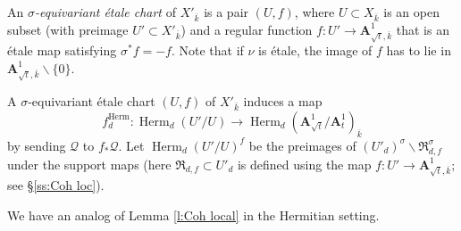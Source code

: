\documentclass[reqno]{amsart}
\numberwithin{equation}{section}
\newcommand{\A}{\mathbf{A}}
\newcommand{\bs}{\backslash}
\DeclareMathOperator{\Herm}{Herm}
\newcommand{\SH}{\textup{SkHm}}
\newcommand{\ov}{\overline}
\newcommand{\s}{\sigma}
\newcommand\cQ{\mathcal{Q}}
\newcommand\frR{\mathfrak{R}}
\theoremstyle{remark}
\numberwithin{equation}{section}
\begin{document}
An {\em $\s$-equivariant \'etale chart} of $X'_{\ov k}$ is  a pair $(U,f)$, where $U\subset X_{\ov k}$ is an open subset (with preimage $U'\subset X'_{\ov k}$) and a regular function $f: U'\to \A^{1}_{\sqrt{t}, \ov k}$ that is an \'etale map satisfying $\s^{*}f=-f$. Note that if $\nu$ is \'etale, the image of $f$ has to lie in $\A^{1}_{\sqrt{t}, \ov k}\bs\{0\}$.  

A  $\s$-equivariant \'etale chart $(U,f)$ of $X'_{\ov k}$ induces a map 
\[
f^{\Herm}_{d}: \Herm_{d}(U'/U)\to \Herm_{d}(\A^{1}_{\sqrt{t}}/\A^{1}_{t})_{\ov k}
\]
by sending $\cQ$ to  $f_{*}\cQ$. Let $\Herm_{d}(U'/U)^{f}$  be the preimages of $(U'_{d})^{\s}\bs \frR^{\s}_{d,f}$ under the support maps (here $\frR_{d,f}\subset U'_{d}$ is defined using the map $f:U'\to \A^{1}_{\sqrt{t},\ov k}$; see \S\ref{ss:Coh loc}). 
 

We have an analog of Lemma \ref{l:Coh local} in the Hermitian setting.
\end{document}
